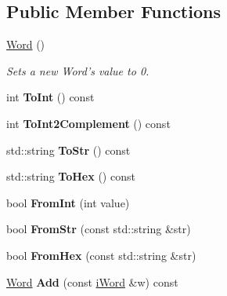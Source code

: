 \subsection*{Public Member Functions}
\begin{DoxyCompactItemize}
\item 
\hypertarget{classWord_a17baf7109d46beb48d5b469f3baedc48}{
\hyperlink{classWord_a17baf7109d46beb48d5b469f3baedc48}{Word} ()}
\label{classWord_a17baf7109d46beb48d5b469f3baedc48}

\begin{DoxyCompactList}\small\item\em Sets a new Word's value to 0. \item\end{DoxyCompactList}\item 
\hypertarget{classWord_acf9a6c3d9cf07d66da592ec76f572464}{
int {\bfseries ToInt} () const }
\label{classWord_acf9a6c3d9cf07d66da592ec76f572464}

\item 
\hypertarget{classWord_a4116e08d36472a287c06a4aa14e7ed4f}{
int {\bfseries ToInt2Complement} () const }
\label{classWord_a4116e08d36472a287c06a4aa14e7ed4f}

\item 
\hypertarget{classWord_a5f8c5dcdb847ed96021ef9282ccc7e76}{
std::string {\bfseries ToStr} () const }
\label{classWord_a5f8c5dcdb847ed96021ef9282ccc7e76}

\item 
\hypertarget{classWord_af71af6fa290db8e9b4719c2b95ba9af0}{
std::string {\bfseries ToHex} () const }
\label{classWord_af71af6fa290db8e9b4719c2b95ba9af0}

\item 
\hypertarget{classWord_aed80a61d7e2da2dbcde483058acd4259}{
bool {\bfseries FromInt} (int value)}
\label{classWord_aed80a61d7e2da2dbcde483058acd4259}

\item 
\hypertarget{classWord_a0b255da1e924b2ab520cc5ca271bacf0}{
bool {\bfseries FromStr} (const std::string \&str)}
\label{classWord_a0b255da1e924b2ab520cc5ca271bacf0}

\item 
\hypertarget{classWord_a247de32d413b48d2934f41caaa6cce77}{
bool {\bfseries FromHex} (const std::string \&str)}
\label{classWord_a247de32d413b48d2934f41caaa6cce77}

\item 
\hypertarget{classWord_ae9478910c6cb8c30abeedf7fc6ba5b36}{
\hyperlink{classWord}{Word} {\bfseries Add} (const \hyperlink{classiWord}{iWord} \&w) const }
\label{classWord_ae9478910c6cb8c30abeedf7fc6ba5b36}


\end{DoxyCompactItemize}
